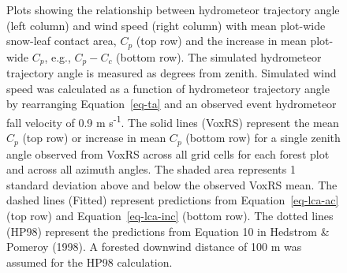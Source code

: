 \documentclass[
  letterpaper,
  DIV=11,
  numbers=noendperiod]{scrartcl}
\begin{document}
\begin{figure}[H]


\caption{\label{fig-lca-ht-ws}Plots showing the relationship between
hydrometeor trajectory angle (left column) and wind speed (right column)
with mean plot-wide snow-leaf contact area, \(C_p\) (top row) and the
increase in mean plot-wide \(C_p\), e.g., \(C_p - C_c\) (bottom row).
The simulated hydrometeor trajectory angle is measured as degrees from
zenith. Simulated wind speed was calculated as a function of hydrometeor
trajectory angle by rearranging Equation~\ref{eq-ta} and an observed
event hydrometeor fall velocity of 0.9 m s\textsuperscript{-1}. The
solid lines (VoxRS) represent the mean \(C_p\) (top row) or increase in
mean \(C_p\) (bottom row) for a single zenith angle observed from VoxRS
across all grid cells for each forest plot and across all azimuth
angles. The shaded area represents 1 standard deviation above and below
the observed VoxRS mean. The dashed lines (Fitted) represent predictions
from Equation~\ref{eq-lca-ac} (top row) and Equation~\ref{eq-lca-inc}
(bottom row). The dotted lines (HP98) represent the predictions from
Equation 10 in Hedstrom \& Pomeroy (1998). A forested downwind distance
of 100 m was assumed for the HP98 calculation.}

\end{figure}%
\end{document}
